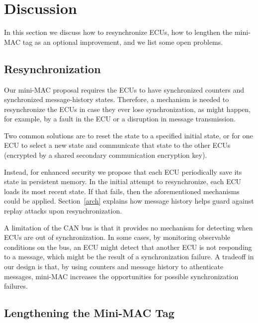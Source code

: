 \section{Discussion}
\label{discuss}

In this section we discuss how to resynchronize ECUs, 
how to lengthen the mini-MAC tag as an optional improvement, 
and we list some open problems.


\subsection{Resynchronization}
\label{resynch}

Our mini-MAC proposal requires the ECUs to have synchronized counters and synchronized message-history states.
Therefore, a mechanism is needed to resynchronize the ECUs in case they ever lose synchronization,
as might happen, for example, by a fault in the ECU or a disruption in message transmission.

Two common solutions are to reset the state to a specified initial state, or for one ECU to select
a new state and communicate that state to the other ECUs (encrypted by a shared secondary communication
encryption key).  

Instead, for enhanced security we propose that each ECU periodically save its state in persistent memory.  
In the initial attempt to resynchronize, each ECU loads its most recent state.  If that fails, then the aforementioned
mechanisms could be applied.  Section~\ref{arch} explains how message history helps guard against
replay attacks upon resynchronization.

A limitation of the CAN bus is that it provides no mechanism for detecting when ECUs are out
of synchronization.  In some cases, by monitoring observable conditions on the bus, 
an ECU might detect that another ECU is not responding to a message, which might be
the result of a synchronization failure.  A tradeoff in our design is that, by using
counters and message history to athenticate messages, 
mini-MAC increases the opportunities for possible synchronization failures.


\subsection{Lengthening the Mini-MAC Tag}
\label{addingbits}

